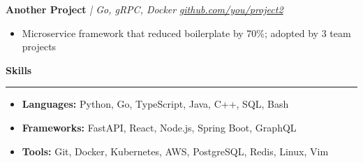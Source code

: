 \documentclass[letterpaper, 10.5pt]{article}
\newcommand{\rsection}[1]{
  \vspace{4pt}
  \noindent\textbf{\large #1}
  \vspace{1pt}
  \hrule
  \vspace{4pt}
}
\begin{document}
\vspace{3pt}
\noindent\textbf{Another Project} \textit{| Go, gRPC, Docker} \hfill \href{https://github.com/you/project2}{\textit{github.com/you/project2}} \\
\begin{itemize}[leftmargin=2em, noitemsep, topsep=1pt, parsep=0pt]
  \item Microservice framework that reduced boilerplate by 70\%; adopted by 3 team projects
\end{itemize}

\rsection{Skills}
\begin{itemize}[leftmargin=0pt, label={}, noitemsep, topsep=0pt]
  \item \textbf{Languages:} Python, Go, TypeScript, Java, C++, SQL, Bash
  \item \textbf{Frameworks:} FastAPI, React, Node.js, Spring Boot, GraphQL
  \item \textbf{Tools:} Git, Docker, Kubernetes, AWS, PostgreSQL, Redis, Linux, Vim
\end{itemize}
\end{document}
